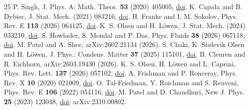 \documentclass{ws-fnl}
\renewcommand{\url}[1]{\href{#1}{doi}}
\begin{document}
\begin{thebibliography}{25}
 P. Singh, J. Phys. A: Math. Theor. {\bf 53} (2020) 405005, \url{https://doi.org/10.1088/1751-8121/abaf2d}.
 K. Capa{\l}a and B. Dybiec, J. Stat. Mech. (2021) 083216, \url{https://doi.org/10.1088/1742-5468/ac1664}.
 H. Franke and I. M. Sokolov, Phys. Rev. E {\bf 113} (2026) 064125, \url{https://doi.org/10.1103/qyl8-6q9h}.
 K. S. Olsen and H. L\"owen, J. Stat. Mech. (2024) 033210, \url{https://doi.org/10.1088/1742-5468/ad319a}.
 S. Howlader, S. Mondal and P. Das, Phys. Fluids {\bf 38} (2026) 067118, \url{https://doi.org/10.1063/5.0333412}.
 M. Patel and A. Shee, arXiv:2602.21134 (2026).
 S. Chaki, K. St{\o}levik Olsen and H. L\"owen, J. Phys.: Condens. Matter {\bf 37} (2025) 115101, \url{https://doi.org/10.1088/1361-648X/ada336}.
 B. Cleuren and R. Eichhorn, arXiv:2603.19430 (2026).
 K. S. Olsen, H. L\"owen and L. Caprini, Phys. Rev. Lett. {\bf 137} (2026) 057102, \url{https://doi.org/10.1103/sytg-m4ms}.
 A. Frishman and P. Ronceray, Phys. Rev. X {\bf 10} (2020) 021009, \url{https://doi.org/10.1103/PhysRevX.10.021009}.
 O. Tal-Friedman, Y. Roichman and S. Reuveni, Phys. Rev. E {\bf 106} (2022) 054116, \url{https://doi.org/10.1103/PhysRevE.106.054116}.
 M. Patel and D. Chaudhuri, New J. Phys. {\bf 25} (2023) 123048, \url{https://doi.org/10.1088/1367-2630/ad1538}; arXiv:2310.00802.
\end{thebibliography}
\end{document}
